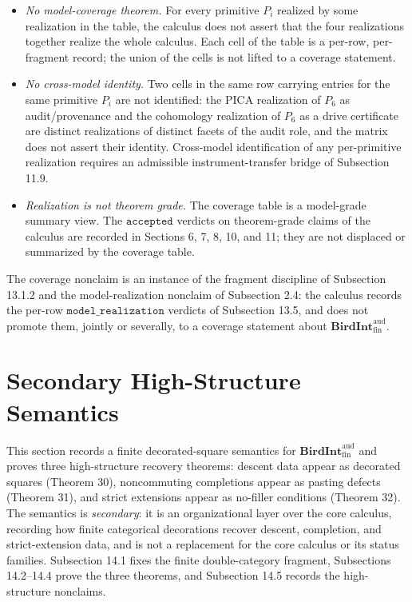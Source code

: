\documentclass[11pt]{article}
\theoremstyle{definition}
\begin{document}
\begin{itemize}
\item
  \emph{No model-coverage theorem.} For every primitive \(P_{i}\) realized by some realization in the table, the calculus does not assert that the four realizations together realize the whole calculus. Each cell of the table is a per-row, per-fragment record; the union of the cells is not lifted to a coverage statement.
\item
  \emph{No cross-model identity.} Two cells in the same row carrying entries for the same primitive \(P_{i}\) are not identified: the PICA realization of \(P_{6}\) as audit/provenance and the cohomology realization of \(P_{6}\) as a drive certificate are distinct realizations of distinct facets of the audit role, and the matrix does not assert their identity. Cross-model identification of any per-primitive realization requires an admissible instrument-transfer bridge of Subsection 11.9.
\item
  \emph{Realization is not theorem grade.} The coverage table is a model-grade summary view. The \(\texttt{accepted}\) verdicts on theorem-grade claims of the calculus are recorded in Sections 6, 7, 8, 10, and 11; they are not displaced or summarized by the coverage table.
\end{itemize}

The coverage nonclaim is an instance of the fragment discipline of Subsection 13.1.2 and the model-realization nonclaim of Subsection 2.4: the calculus records the per-row \(\texttt{model\_realization}\) verdicts of Subsection 13.5, and does not promote them, jointly or severally, to a coverage statement about \(\mathbf{BirdInt}^{\mathrm{aud}}_{\mathrm{fin}}\).
 \section{Secondary High-Structure Semantics}

This section records a finite decorated-square semantics for \(\mathbf{BirdInt}^{\mathrm{aud}}_{\mathrm{fin}}\) and proves three high-structure recovery theorems: descent data appear as decorated squares (Theorem 30), noncommuting completions appear as pasting defects (Theorem 31), and strict extensions appear as no-filler conditions (Theorem 32). The semantics is \emph{secondary}: it is an organizational layer over the core calculus, recording how finite categorical decorations recover descent, completion, and strict-extension data, and is not a replacement for the core calculus or its status families. Subsection 14.1 fixes the finite double-category fragment, Subsections 14.2--14.4 prove the three theorems, and Subsection 14.5 records the high-structure nonclaims.
\end{document}
